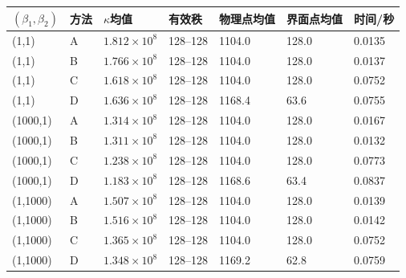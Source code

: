 \begin{tabular}{lllllll}\toprule
$(\beta_1,\beta_2)$ & 方法 & $\kappa$均值 & 有效秩 & 物理点均值 & 界面点均值 & 时间/秒 \\ \midrule
(1,1) & A & $1.812\times10^{8}$ & 128--128 & 1104.0 & 128.0 & 0.0135 \\
(1,1) & B & $1.766\times10^{8}$ & 128--128 & 1104.0 & 128.0 & 0.0137 \\
(1,1) & C & $1.618\times10^{8}$ & 128--128 & 1104.0 & 128.0 & 0.0752 \\
(1,1) & D & $1.636\times10^{8}$ & 128--128 & 1168.4 & 63.6 & 0.0755 \\
(1000,1) & A & $1.314\times10^{8}$ & 128--128 & 1104.0 & 128.0 & 0.0167 \\
(1000,1) & B & $1.311\times10^{8}$ & 128--128 & 1104.0 & 128.0 & 0.0132 \\
(1000,1) & C & $1.238\times10^{8}$ & 128--128 & 1104.0 & 128.0 & 0.0773 \\
(1000,1) & D & $1.183\times10^{8}$ & 128--128 & 1168.6 & 63.4 & 0.0837 \\
(1,1000) & A & $1.507\times10^{8}$ & 128--128 & 1104.0 & 128.0 & 0.0139 \\
(1,1000) & B & $1.516\times10^{8}$ & 128--128 & 1104.0 & 128.0 & 0.0142 \\
(1,1000) & C & $1.365\times10^{8}$ & 128--128 & 1104.0 & 128.0 & 0.0752 \\
(1,1000) & D & $1.348\times10^{8}$ & 128--128 & 1169.2 & 62.8 & 0.0759 \\
\bottomrule\end{tabular}
